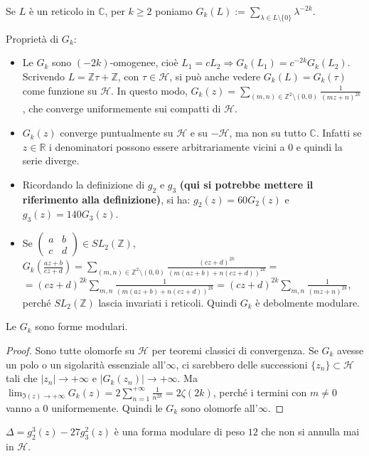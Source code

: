 \begin{definizione}
Se $L$ è un reticolo in $\mathbb{C}$, per $k \geq 2$ poniamo
$G_k(L):=\displaystyle{\sum_{\lambda \in L \setminus \{ 0 \}}{\lambda ^{-2k}}}$.
\end{definizione}

\begin{osservazione}
Proprietà di $G_k$:

\begin{itemize}
\item Le $G_k$ sono $(-2k)$-omogenee, cioè
$L_1=cL_2 \Rightarrow G_k(L_1)=c^{-2k}G_k(L_2)$.
Scrivendo $L=\mathbb{Z} \tau + \mathbb{Z}$, con $\tau \in \mathcal{H}$,
si può anche vedere $G_k(L) = G_k(\tau)$ come funzione su $\mathcal{H}$.
In questo modo, $\displaystyle{G_k(z)=\sum_{(m,n) \in \mathbb{Z}^2 \setminus
(0,0)}{\frac{1}{(mz+n)^{2k}}}}$, che converge uniformemente sui compatti
di $\mathcal{H}$.
\item $G_k(z)$ converge puntualmente su $\mathcal{H}$ e su $-\mathcal{H}$, ma non su tutto $\mathbb{C}$. Infatti se $z \in \mathbb{R}$ i denominatori possono
essere arbitrariamente vicini a $0$ e quindi la serie diverge.
\item Ricordando la definizione di $g_2$ e $g_3$ \textbf{\textcolor[rgb]{1,0,0}{(qui si potrebbe mettere il riferimento alla definizione)}}, si ha: $g_2(z)=60G_2(z)$ e $g_3(z)=140G_3(z)$.
\item Se $\left( \begin{array}{cc} a & b \\ c & d \end{array} \right) \in
SL_2 \left( \mathbb{Z} \right)$,
$\displaystyle{ G_k \left(\frac{az+b}{cz+d} \right) = 
\sum_{(m,n) \in \mathbb{Z}^2 \setminus (0,0)}
{\frac{(cz+d)^{2k}} {(m(az+b)+n(cz+d))^{2k}}} =}$
$\displaystyle{ =(cz+d)^{2k} \sum_{m,n}{\frac{1} {(m(az+b)+n(cz+d))^{2k}}} =
(cz+d)^{2k} \sum_{m,n}{\frac{1}{(mz+n)^{2k}}} }$, perché
$SL_2 \left( \mathbb{Z} \right)$ lascia invariati i reticoli. Quindi $G_k$
è debolmente modulare.
\end{itemize}
\end{osservazione}


\begin{proposizione}
Le $G_k$ sono forme modulari.
\end{proposizione}

\begin{proof}
Sono tutte olomorfe su $\mathcal{H}$ per teoremi classici di convergenza.
Se $G_k$ avesse un polo o un sigolarità essenziale all'$\infty$, ci sarebbero
delle successioni $\{ z_n \} \subset \mathcal{H}$ tali che
$|z_n| \rightarrow +\infty$ e $|G_k(z_n)| \rightarrow +\infty$.
Ma $\displaystyle{\lim_{\Im(z) \rightarrow +\infty} G_k(z)=
2 \sum_{n=1}^{+\infty}{\frac{1}{n^{2k}}} = 2 \zeta(2k)}$, perché i termini
con $m \neq 0$ vanno a $0$ uniformemente. Quindi le $G_k$ sono olomorfe
all'$\infty$.
\end{proof}

\begin{osservazione}
$\Delta = g_2 ^3 (z) - 27 g_3 ^2 (z)$ è una forma modulare di peso $12$ che
non si annulla mai in $\mathcal{H}$.
\end{osservazione}